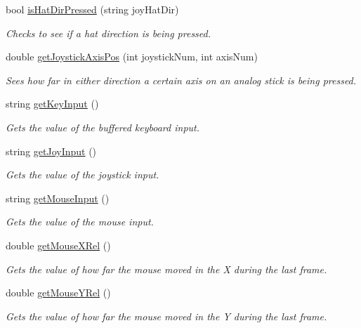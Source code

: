 \begin{CompactItemize}
bool \hyperlink{class_input_c4b16d6f64e089b08c6b680bbb354d89}{isHatDirPressed} (string joyHatDir)
\begin{CompactList}\small\item\em Checks to see if a hat direction is being pressed. \item\end{CompactList}\item 
double \hyperlink{class_input_265e726a4efb833935ccc9ce82af34dc}{getJoystickAxisPos} (int joystickNum, int axisNum)
\begin{CompactList}\small\item\em Sees how far in either direction a certain axis on an analog stick is being pressed. \item\end{CompactList}\item 
string \hyperlink{class_input_1c744fa7df4499ec4da63cc283f9421f}{getKeyInput} ()
\begin{CompactList}\small\item\em Gets the value of the buffered keyboard input. \item\end{CompactList}\item 
string \hyperlink{class_input_1ba9317efac42d8f0ff0d81d22585e77}{getJoyInput} ()
\begin{CompactList}\small\item\em Gets the value of the joystick input. \item\end{CompactList}\item 
string \hyperlink{class_input_2076359bf82d116ae3b1a91db1c123f2}{getMouseInput} ()
\begin{CompactList}\small\item\em Gets the value of the mouse input. \item\end{CompactList}\item 
double \hyperlink{class_input_36213ede97566bcbcc06d709672b5eb7}{getMouseXRel} ()
\begin{CompactList}\small\item\em Gets the value of how far the mouse moved in the X during the last frame. \item\end{CompactList}\item 
double \hyperlink{class_input_9e6dc2cf7d8e68b491fd1b5b243f8ffb}{getMouseYRel} ()
\begin{CompactList}\small\item\em Gets the value of how far the mouse moved in the Y during the last frame. \item\end{CompactList}\item 

\end{CompactItemize}

